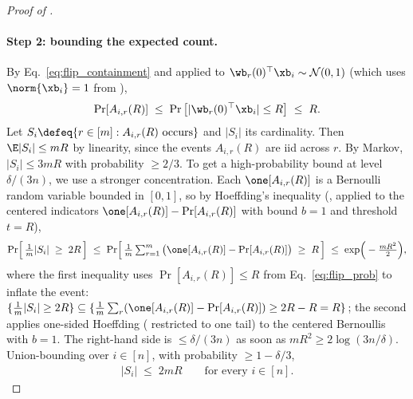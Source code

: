 \begin{proof}[Proof of ]
\paragraph{Step 2: bounding the expected count.}
By Eq.~\eqref{eq:flip_containment} and  applied to $\wb_r(0)^\top \xb_i \sim \mathcal N(0, 1)$ (which uses $\norm{\xb_i}=1$ from ),
\begin{align}\label{eq:flip_prob}
\Pr[A_{i,r}(R)] \;\le\; \Pr\big[ |\wb_r(0)^\top \xb_i| \le R \big] \;\le\; R.
\end{align}
Let $S_i \defeq \{ r \in [m] : A_{i, r}(R) \text{ occurs} \}$ and $|S_i|$ its cardinality. Then $\E |S_i| \le m R$ by linearity, since the events $A_{i, r}(R)$ are iid across $r$. By Markov, $|S_i| \le 3 m R$ with probability $\ge 2/3$. To get a high-probability bound at level $\delta/(3n)$, we use a stronger concentration. Each $\one[A_{i,r}(R)]$ is a Bernoulli random variable bounded in $[0, 1]$, so by Hoeffding's inequality (, applied to the centered indicators $\one[A_{i,r}(R)] - \Pr[A_{i,r}(R)]$ with bound $b = 1$ and threshold $t = R$),
\begin{align*}
\Pr\!\Big[ \, \tfrac{1}{m} |S_i| \;\ge\; 2R \, \Big]
\;\le\; \Pr\!\Big[ \, \tfrac{1}{m}\textstyle\sum_{r=1}^m \big( \one[A_{i,r}(R)] - \Pr[A_{i,r}(R)] \big) \;\ge\; R \, \Big]
\;\le\; \exp\!\Big( - \tfrac{m R^2}{2} \Big),
\end{align*}
where the first inequality uses $\Pr[A_{i,r}(R)] \le R$ from Eq.~\eqref{eq:flip_prob} to inflate the event: $\{\tfrac{1}{m}|S_i| \ge 2R\} \subseteq \{\tfrac{1}{m} \sum_r (\one[A_{i,r}(R)] - \Pr[A_{i,r}(R)]) \ge 2R - R = R\}$; the second applies one-sided Hoeffding ( restricted to one tail) to the centered Bernoullis with $b = 1$. The right-hand side is $\le \delta / (3n)$ as soon as $m R^2 \ge 2 \log(3 n / \delta)$. Union-bounding over $i \in [n]$, with probability $\ge 1 - \delta/3$,
\begin{align}\label{eq:flip_count}
|S_i| \;\le\; 2 m R \qquad \text{for every } i \in [n].
\end{align}


\end{proof}
